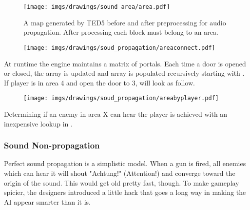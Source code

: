 \par
\begin{figure}[H]
 \centering
 \texttt{[image: imgs/drawings/sound\_area/area.pdf]}
 \caption{A map generated by TED5 before and after preprocessing for audio propagation. After processing each block must belong to an area.}
\end{figure}
\par



\begin{figure}[H]
 \centering
 \texttt{[image: imgs/drawings/soud\_propagation/areaconnect.pdf]}
\end{figure}
\par
At runtime the engine maintains a matrix of portals. Each time a door is opened or closed, the array  is updated and  array is populated recursively starting with . If player is in area 4 and open the door to 3,  will look as follow.
\par
\begin{figure}[H]
 \centering
 \texttt{[image: imgs/drawings/soud\_propagation/areabyplayer.pdf]}
\end{figure}
\par
Determining if an enemy in area X can hear the player is achieved with an inexpensive lookup in .\\
\par
\begin{minipage}{\textwidth}

\end{minipage}
\par
\par







\subsubsection{Sound Non-propagation}
Perfect sound propagation is a simplistic model. When a gun is fired, all enemies which can hear it will shout "Achtung!" (Attention!) and converge toward the origin of the sound. This would get old pretty fast, though. To make gameplay spicier, the designers introduced a little hack that goes a long way in making the AI appear smarter than it is.


